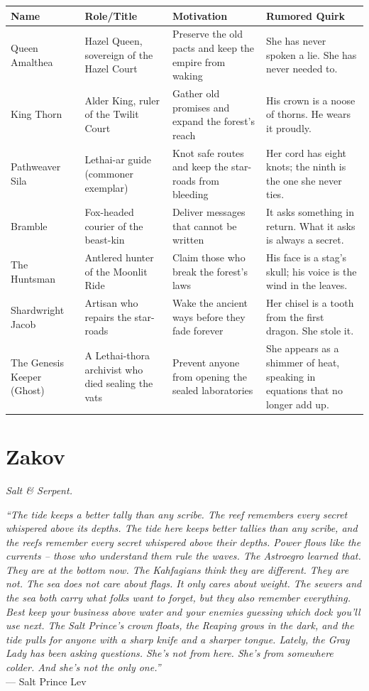 \documentclass[12pt,oneside]{book}
\begin{document}
\begin{longtable}{|p{}|p{}|p{}|p{}|}
\hline
\textbf{Name} & \textbf{Role/Title} & \textbf{Motivation} & \textbf{Rumored Quirk} \\
\hline
Queen Amalthea & Hazel Queen, sovereign of the Hazel Court & Preserve the old pacts and keep the empire from waking & She has never spoken a lie. She has never needed to. \\
\hline
King Thorn & Alder King, ruler of the Twilit Court & Gather old promises and expand the forest's reach & His crown is a noose of thorns. He wears it proudly. \\
\hline
Pathweaver Sila & Lethai-ar guide (commoner exemplar) & Knot safe routes and keep the star-roads from bleeding & Her cord has eight knots; the ninth is the one she never ties. \\
\hline
Bramble & Fox-headed courier of the beast-kin & Deliver messages that cannot be written & It asks something in return. What it asks is always a secret. \\
\hline
The Huntsman & Antlered hunter of the Moonlit Ride & Claim those who break the forest's laws & His face is a stag's skull; his voice is the wind in the leaves. \\
\hline
Shardwright Jacob & Artisan who repairs the star-roads & Wake the ancient ways before they fade forever & Her chisel is a tooth from the first dragon. She stole it. \\
\hline
The Genesis Keeper (Ghost) & A Lethai-thora archivist who died sealing the vats & Prevent anyone from opening the sealed laboratories & She appears as a shimmer of heat, speaking in equations that no longer add up. \\
\hline
\end{longtable}



\newpage

\chapter{Zakov}
\emph{Salt \& Serpent.}

\noindent
\textit{``The tide keeps a better tally than any scribe. The reef remembers every secret whispered above its depths. The tide here keeps better tallies than any scribe, and the reefs remember every secret whispered above their depths. Power flows like the currents -- those who understand them rule the waves. The Astroegro learned that. They are at the bottom now. The Kahfagians think they are different. They are not. The sea does not care about flags. It only cares about weight. The sewers and the sea both carry what folks want to forget, but they also remember everything. Best keep your business above water and your enemies guessing which dock you'll use next. The Salt Prince's crown floats, the Reaping grows in the dark, and the tide pulls for anyone with a sharp knife and a sharper tongue. Lately, the Gray Lady has been asking questions. She's not from here. She's from somewhere colder. And she's not the only one.''} \\
--- Salt Prince Lev
\end{document}
